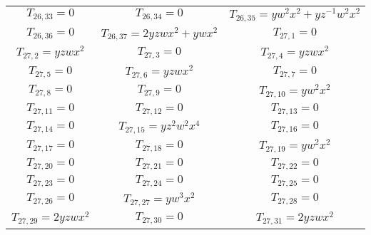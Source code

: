 \documentclass[12pt]{memoireuqam1.3}
\begin{document}
\begin{longtable}{|c|c|c|}
$T_{26,33}= 0$&

$T_{26,34}= 0$&

$T_{26,35}= yw^2x^2+yz^{-1}w^2x^2$\\

$T_{26,36}= 0$&

$T_{26,37}= 2yzwx^2+ywx^2$&

$T_{27,1}= 0$\\

$T_{27,2}= yzwx^2$&

$T_{27,3}= 0$&

$T_{27,4}= yzwx^2$\\

$T_{27,5}= 0$&

$T_{27,6}= yzwx^2$&

$T_{27,7}= 0$\\

$T_{27,8}= 0$&

$T_{27,9}= 0$&

$T_{27,10}= yw^2x^2$\\

$T_{27,11}= 0$&

$T_{27,12}= 0$&

$T_{27,13}= 0$\\

$T_{27,14}= 0$&

$T_{27,15}= yz^2w^2x^4$&

$T_{27,16}= 0$\\

$T_{27,17}= 0$&

$T_{27,18}= 0$&

$T_{27,19}= yw^2x^2$\\

$T_{27,20}= 0$&

$T_{27,21}= 0$&

$T_{27,22}= 0$\\

$T_{27,23}= 0$&

$T_{27,24}= 0$&

$T_{27,25}= 0$\\

$T_{27,26}= 0$&

$T_{27,27}= yw^3x^2$&

$T_{27,28}= 0$\\

$T_{27,29}= 2yzwx^2$&

$T_{27,30}= 0$&

$T_{27,31}= 2yzwx^2$\\


\end{longtable}
\end{document}
